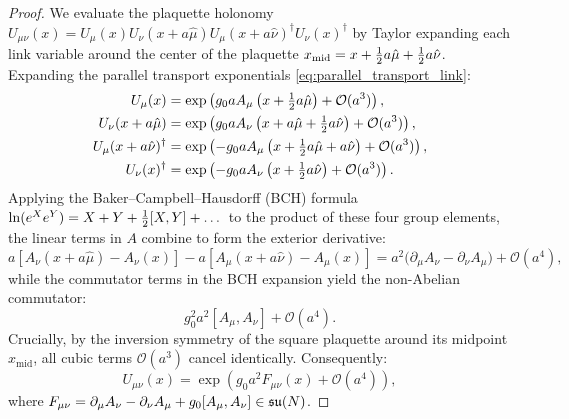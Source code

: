 \begin{proof}
We evaluate the plaquette holonomy $U_{\mu\nu}(x) = U_\mu(x) U_\nu(x + a\hat{\mu}) U_\mu(x + a\hat{\nu})^\dagger U_\nu(x)^\dagger$ by Taylor expanding each link variable around the center of the plaquette $x_{\mathrm{mid}} = x + \tfrac{1}{2} a\hat{\mu} + \tfrac{1}{2} a\hat{\nu}$. Expanding the parallel transport exponentials \eqref{eq:parallel_transport_link}:
\begin{align}
U_\mu(x) &= \exp\left( g_0 a A_\mu\left( x + \tfrac{1}{2} a\hat{\mu} \right) + \mathcal{O}(a^3) \right), \\
U_\nu(x + a\hat{\mu}) &= \exp\left( g_0 a A_\nu\left( x + a\hat{\mu} + \tfrac{1}{2} a\hat{\nu} \right) + \mathcal{O}(a^3) \right), \\
U_\mu(x + a\hat{\nu})^\dagger &= \exp\left( -g_0 a A_\mu\left( x + \tfrac{1}{2} a\hat{\mu} + a\hat{\nu} \right) + \mathcal{O}(a^3) \right), \\
U_\nu(x)^\dagger &= \exp\left( -g_0 a A_\nu\left( x + \tfrac{1}{2} a\hat{\nu} \right) + \mathcal{O}(a^3) \right).
\end{align}
Applying the Baker--Campbell--Hausdorff (BCH) formula $\ln(e^X e^Y) = X + Y + \tfrac{1}{2} [X, Y] + \dots$ to the product of these four group elements, the linear terms in $A$ combine to form the exterior derivative:
\begin{equation}
a \left[ A_\nu(x + a\hat{\mu}) - A_\nu(x) \right] - a \left[ A_\mu(x + a\hat{\nu}) - A_\mu(x) \right] = a^2 \bigl( \partial_\mu A_\nu - \partial_\nu A_\mu \bigr) + \mathcal{O}(a^4),
\end{equation}
while the commutator terms in the BCH expansion yield the non-Abelian commutator:
\begin{equation}
g_0^2 a^2 [A_\mu, A_\nu] + \mathcal{O}(a^4).
\end{equation}
Crucially, by the inversion symmetry of the square plaquette around its midpoint $x_{\mathrm{mid}}$, all cubic terms $\mathcal{O}(a^3)$ cancel identically. Consequently:
\begin{equation}
\label{eq:bch_plaquette_result}
U_{\mu\nu}(x) = \exp\left( g_0 a^2 F_{\mu\nu}(x) + \mathcal{O}(a^4) \right),
\end{equation}
where $F_{\mu\nu} = \partial_\mu A_\nu - \partial_\nu A_\mu + g_0 [A_\mu, A_\nu] \in \mathfrak{su}(N)$.


\end{proof}
